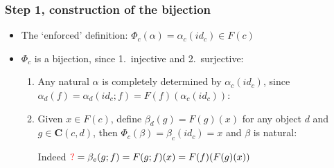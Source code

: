 \documentclass[handout]{beamer}
\newcommand{\redc}{{\color{red} c}}
\newcommand{\bfsf}[1]{{\boldsymbol{#1}}}
\newcommand{\CC}{\bfsf{C}}
\begin{document}
\frame
  {   
    \frametitle{Step 1, construction of the bijection}\label{Yon:bijection}

 \begin{itemize}[<+->]
\item The `enforced' definition: $\Phi_c(\alpha) = \alpha_c(id_c) \in F(c)$
\item $\Phi_c$ is a bijection, since 1.\ injective and 2.\ surjective:
 \begin{enumerate}
    \item Any natural $\alpha$ is completely determined by $\alpha_c(id_c)$, 
since $\alpha_d(f)=\alpha_d(id_c;f)=F(f)(\alpha_c(id_c))$:\\
    \item Given $x\in F(c)$, define $\beta_d(g)=F(g)(x)$ for any object $d$ 
and $g\in\CC(c,d)$, then $\Phi_c(\beta)=\beta_c(id_c) =x$ and $\beta$ is natural:
Indeed ${\color{red} ?}=\beta_e(g;f)=F(g;f)(x) = F(f)(F(g)(x))$
\end{enumerate}
 \end{itemize}

 }
\end{document}
